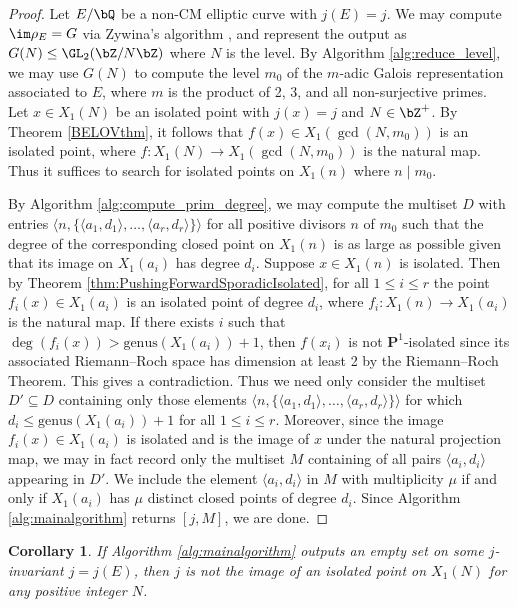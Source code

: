\documentclass[11pt,reqno]{amsart}
\theoremstyle{plain}
\newtheorem{corollary}[theorem]{Corollary}
\theoremstyle{definition}
\newcommand{\Q}{\bQ}
\newcommand{\Z}{\bZ}
\newcommand{\PP}{\mathbf P}
\begin{document}
\begin{proof}
Let $E/\Q$ be a non-CM elliptic curve with $j(E)=j$. We may compute $\im \rho_E=G$ via Zywina's algorithm \cite{ZywinaAlgorithm}, and represent the output as $G(N) \leq \GL_2(\Z/N\Z)$ where $N$ is the level. By Algorithm \ref{alg:reduce_level}, we may use $G(N)$ to compute the level $m_0$ of the $m$-adic Galois representation associated to $E$, where $m$ is the product of 2, 3, and all non-surjective primes. Let $x\in X_1(N)$ be an isolated point with $j(x)=j$ and $N\in \Z^+$. By Theorem \ref{BELOVthm}, it follows that $f(x)\in X_1(\gcd(N,m_0))$ is an isolated point, where $f\colon X_1(N) \rightarrow X_1(\gcd(N,m_0))$ is the natural map. Thus it suffices to search for isolated points on $X_1(n)$ where $n \mid m_0$.

By Algorithm \ref{alg:compute_prim_degree}, we may compute the multiset $D$ with entries $\langle n, \{\langle a_1, d_1\rangle ,  \dots,  \langle a_r, d_r\rangle \} \rangle$ for all positive divisors $n$ of $m_0$ such that the degree of the corresponding closed point on $X_1(n)$ is as large as possible given that its image on $X_1(a_i) $ has degree $d_i$. Suppose $x \in X_1(n)$ is isolated. Then by Theorem \ref{thm:PushingForwardSporadicIsolated}, for all $1\leq i \leq r$ the point $f_i(x) \in X_1(a_i)$ is an isolated point of degree $d_i$, where $f_i: X_1(n) \rightarrow X_1(a_i)$ is the natural map. If there exists $i$ such that $\deg(f_i(x))>\text{genus}(X_1(a_i))+1$, then $f(x_i)$ is not $\PP^1$-isolated since its associated Riemann--Roch space has dimension at least 2 by the Riemann--Roch Theorem. This gives a contradiction. Thus we need only consider the multiset $D' \subseteq D$ containing only those elements $\langle n, \{\langle a_1, d_1\rangle ,  \dots,  \langle a_r, d_r\rangle \} \rangle$ for which $d_i \leq \text{genus}(X_1(a_i))+1$ for all $1 \leq i \leq r$. Moreover, since the image $f_i(x) \in X_1(a_i)$ is isolated and is the image of $x$ under the natural projection map, we may in fact record only the multiset $M$ containing of all pairs $\langle a_i,d_i\rangle $ appearing in $D'$. We include the element $\langle a_i,d_i\rangle $ in $M$ with multiplicity $\mu$ if and only if $X_1(a_i)$ has $\mu$ distinct closed points of degree $d_i$. Since Algorithm \ref{alg:mainalgorithm} returns $[j,M]$, we are done.
\end{proof}



\begin{corollary}\label{cor:P1_isolated}
If Algorithm \ref{alg:mainalgorithm} outputs an empty set on some $j$-invariant $j = j(E)$, then $j$ is not the image of an  isolated point on $X_1(N)$ for any positive integer $N$.
\end{corollary}
\end{document}
